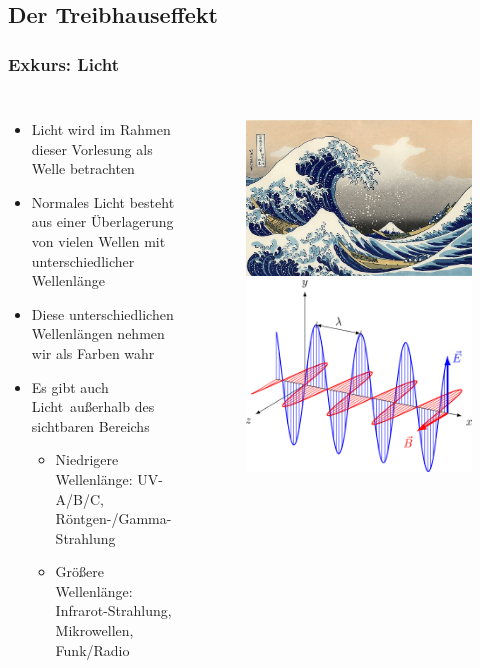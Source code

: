 \subsection{Der Treibhauseffekt}
\begin{frame}
	\frametitle{Exkurs: Licht}
	\begin{columns}
		\begin{itemize}
			\item Licht wird im Rahmen dieser Vorlesung als Welle betrachten
			\item Normales Licht besteht aus einer Überlagerung von vielen Wellen mit unterschiedlicher Wellenlänge
			\item Diese unterschiedlichen Wellenlängen nehmen wir als Farben wahr
			\item Es gibt auch \glq Licht\grq\ außerhalb des sichtbaren Bereichs
			\begin{itemize}
				\item Niedrigere Wellenlänge: UV-A/B/C, Röntgen-/Gamma-Strahlung
				\item Größere Wellenlänge: Infrarot-Strahlung, Mikrowellen, Funk/Radio
			\end{itemize}
		\end{itemize}
	\begin{figure}
		\centering
		\includegraphics[width=0.5\linewidth]{bilder/welle}
		\includegraphics[width=0.5\linewidth]{bilder/EM-Wave_noGIF}\\

\end{figure}
\end{columns}
\end{frame}
